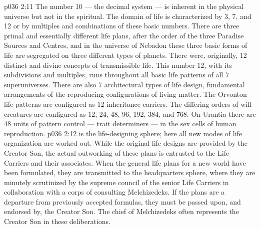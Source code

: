 \vs p036 2:11 The number 10 --- the decimal system --- is inherent in the physical universe but not in the spiritual. The domain of life is characterized by 3, 7, and 12 or by multiples and combinations of these basic numbers. There are three primal and essentially different life plans, after the order of the three Paradise Sources and Centres, and in the universe of Nebadon these three basic forms of life are segregated on three different types of planets. There were, originally, 12 distinct and divine concepts of transmissible life. This number 12, with its subdivisions and multiples, runs throughout all basic life patterns of all 7 superuniverses. There are also 7 architectural types of life design, fundamental arrangements of the reproducing configurations of living matter. The Orvonton life patterns are configured as 12 inheritance carriers. The differing orders of will creatures are configured as 12, 24, 48, 96, 192, 384, and 768. On Urantia there are 48 units of pattern control --- trait determiners --- in the sex cells of human reproduction.
\vs p036 2:12 \pc {} is the life\hyp{}designing sphere; here all new modes of life organization are worked out. While the original life designs are provided by the Creator Son, the actual outworking of these plans is entrusted to the Life Carriers and their associates. When the general life plans for a new world have been formulated, they are transmitted to the headquarters sphere, where they are minutely scrutinized by the supreme council of the senior Life Carriers in collaboration with a corps of consulting Melchizedeks. If the plans are a departure from previously accepted formulas, they must be passed upon, and endorsed by, the Creator Son. The chief of Melchizedeks often represents the Creator Son in these deliberations.
